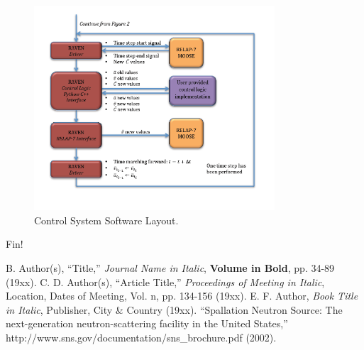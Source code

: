 \documentclass{mc2013}
\begin{document}
\begin{figure}[h] 
  \centering
     \includegraphics[width=0.8\textwidth]{figures/CalculationFlow_part_2.PNG}
  \caption{Control System Software Layout.}
  \label{fig:CalcFlow2}
\end{figure}




Fin!


\setlength{\baselineskip}{12pt}
\begin{thebibliography}{300}
 B. Author(s), ``Title,'' {\it Journal Name in Italic}, 
          {\bf Volume in Bold}, pp. 34-89 (19xx).
 C. D. Author(s), ``Article Title,'' {\it Proceedings of
          Meeting in Italic}, Location, Dates of Meeting, Vol. n, pp. 134-156 
          (19xx).
 E. F. Author, {\it Book Title in Italic}, Publisher, City \&
          Country (19xx). 
 ``Spallation Neutron Source: The next-generation 
          neutron-scattering facility in the United States,'' 
          http://www.sns.gov/documentation/sns\_brochure.pdf (2002).
\end{thebibliography}
\end{document}
